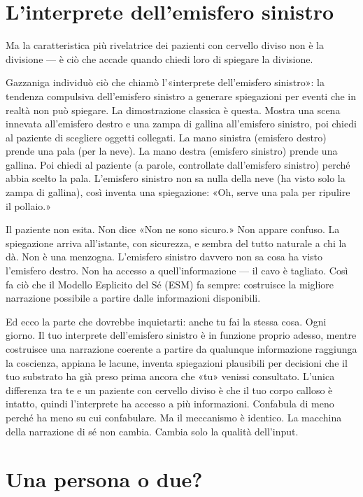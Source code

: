 \documentclass[11pt, twoside, openright]{book}
\begin{document}
\section*{L'interprete dell'emisfero sinistro}

Ma la caratteristica più rivelatrice dei pazienti con cervello diviso non è la divisione --- è ciò che accade quando chiedi loro di spiegare la divisione.

Gazzaniga individuò ciò che chiamò l'«interprete dell'emisfero sinistro»: la tendenza compulsiva dell'emisfero sinistro a generare spiegazioni per eventi che in realtà non può spiegare. La dimostrazione classica è questa. Mostra una scena innevata all'emisfero destro e una zampa di gallina all'emisfero sinistro, poi chiedi al paziente di scegliere oggetti collegati. La mano sinistra (emisfero destro) prende una pala (per la neve). La mano destra (emisfero sinistro) prende una gallina. Poi chiedi al paziente (a parole, controllate dall'emisfero sinistro) perché abbia scelto la pala. L'emisfero sinistro non sa nulla della neve (ha visto solo la zampa di gallina), così inventa una spiegazione: «Oh, serve una pala per ripulire il pollaio.»

Il paziente non esita. Non dice «Non ne sono sicuro.» Non appare confuso. La spiegazione arriva all'istante, con sicurezza, e sembra del tutto naturale a chi la dà. Non è una menzogna. L'emisfero sinistro davvero non sa cosa ha visto l'emisfero destro. Non ha accesso a quell'informazione --- il cavo è tagliato. Così fa ciò che il Modello Esplicito del Sé (ESM) fa sempre: costruisce la migliore narrazione possibile a partire dalle informazioni disponibili.

Ed ecco la parte che dovrebbe inquietarti: anche tu fai la stessa cosa. Ogni giorno. Il tuo interprete dell'emisfero sinistro è in funzione proprio adesso, mentre costruisce una narrazione coerente a partire da qualunque informazione raggiunga la coscienza, appiana le lacune, inventa spiegazioni plausibili per decisioni che il tuo substrato ha già preso prima ancora che «tu» venissi consultato. L'unica differenza tra te e un paziente con cervello diviso è che il tuo corpo calloso è intatto, quindi l'interprete ha accesso a più informazioni. Confabula di meno perché ha meno su cui confabulare. Ma il meccanismo è identico. La macchina della narrazione di sé non cambia. Cambia solo la qualità dell'input.

\section*{Una persona o due?}
\end{document}

